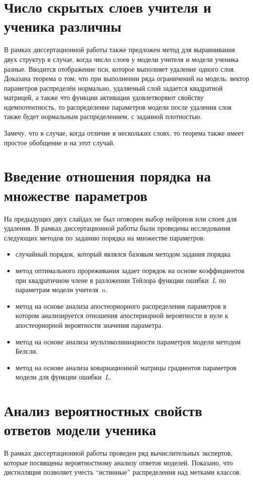 \documentclass[10pt, twoside]{article}
\begin{document}
\section{Число скрытых слоев учителя и ученика различны}
В рамках диссертационной работы также предложен метод для выравнивания двух структур в случае, когда число слоев у модели учителя и модели ученика разные.
Вводится отображение пси, которое выполняет удаление одного слоя.
Доказана теорема о том, что при выполнении ряда ограничений на модель: вектор параметров распределён нормально, удаляемый слой задается квадратной матрицей, а также что функции активации удовлетворяют свойству идемпотентность, то распределение параметров модели после удаления слоя также будет нормальным распределением, с заданной плотностью.

Замечу, что в случае, когда отличие в нескольких слоях, то теорема также имеет простое обобщение и на этот случай.

\section{Введение отношения порядка на множестве параметров}
На предыдущих двух слайдах не был оговорен выбор нейронов или слоев для удаления. В рамках диссертационной работы были проведены исследования следующих методов по заданию порядка на множестве параметров:
\begin{itemize}
    \item случайный порядок, который являлся базовым методом задания порядка
    \item метод оптимального прореживания задает порядок на основе коэффициентов при квадратичном члене в разложении Тейлора функции ошибки~$L$ по параметрам модели учителя~$u$.
    \item метод на основе анализа апостеориорного распределения параметров в котором анализируется отношения апостериорной вероятности в нуле к апостеориорной вероятности значения параметра.
    \item метод на основе анализа мультиколиниарности параметров модели методом Белсли.
    \item метод на основе анализа ковариационной матрицы градиентов параметров модели для функции ошибки~$L$.
\end{itemize}
\section{Анализ вероятностных свойств ответов модели ученика}
В рамках диссертационной работы проведен ряд вычислительных экспертов, которые посвящены вероятностному анализу ответов моделей. Показано, что дистилляция позволяет учесть ``истинные'' распределения над метками классов.
\end{document}

